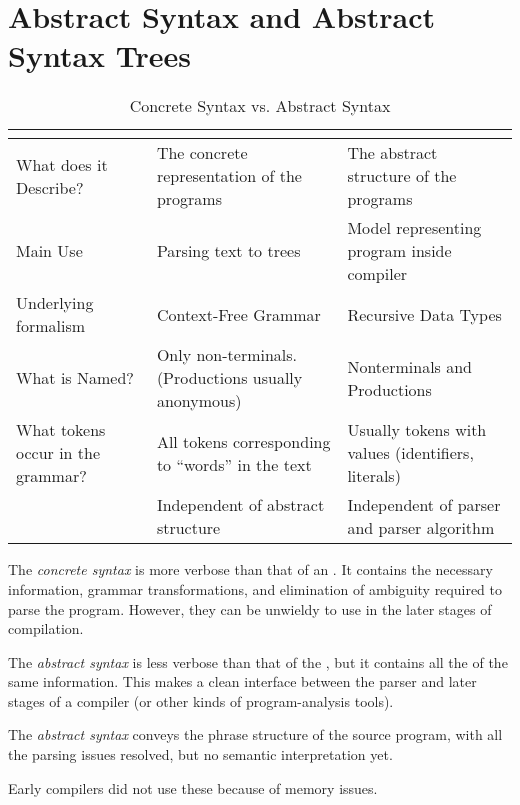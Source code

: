 \section{Abstract Syntax and Abstract Syntax Trees}\label{sec:Abstract_Syntax_and_ASTs}
\begin{table}[h!]
  \centering
  \begin{tabular}{p{3cm}p{6cm}p{6cm}}
    \toprule
    & \multicolumn{1}{c}{\textbf{\nameref{def:Concrete_Syntax}}} & \multicolumn{1}{c}{\textbf{\nameref{def:Abstract_Syntax}}} \\
    \midrule
    What does it Describe? & The concrete representation of the programs & The abstract structure of the programs \\ \midrule
    Main Use & Parsing text to trees & Model representing program inside compiler \\ \midrule
    Underlying formalism & Context-Free Grammar & Recursive Data Types \\ \midrule
    What is Named? & Only non-terminals. (Productions usually anonymous) & Nonterminals and Productions \\ \midrule
    What tokens occur in the grammar? & All tokens corresponding to ``words'' in the text & Usually tokens with values (identifiers, literals) \\ \midrule
    & Independent of abstract structure & Independent of parser and parser algorithm \\
    \bottomrule
  \end{tabular}
  \caption{Concrete Syntax vs. Abstract Syntax}
  \label{tab:Concrete_vs_Abstract_Syntax}
\end{table}

\begin{definition}\label{def:Concrete_Syntax}
  The \emph{concrete syntax} is more verbose than that of an .
  It contains the necessary information, grammar transformations, and elimination of ambiguity required to parse the program.
  However, they can be unwieldy to use in the later stages of compilation.
\end{definition}

\begin{definition}\label{def:Abstract_Syntax}
  The \emph{abstract syntax} is less verbose than that of the , but it contains all the of the same information.
  This makes a clean interface between the parser and later stages of a compiler (or other kinds of program-analysis tools).
  
  The \emph{abstract syntax} conveys the phrase structure of the source program, with all the parsing issues resolved, but no semantic interpretation yet.

  Early compilers did not use these because of memory issues.
\end{definition}

